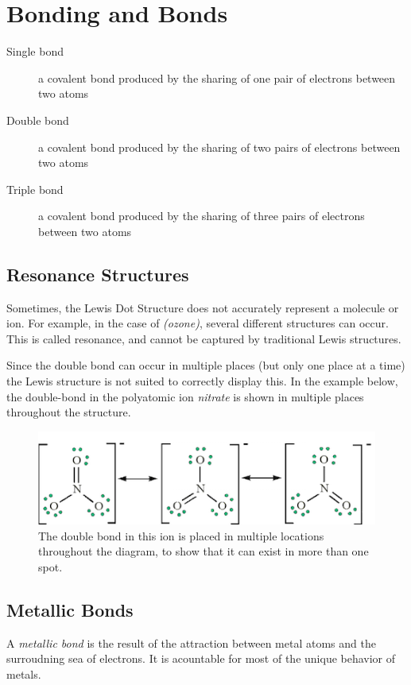 \section{Bonding and Bonds}
\begin{description}
  \item[Single bond] a covalent bond produced by the sharing of one pair of
    electrons between two atoms
  \item[Double bond] a covalent bond produced by the sharing of two pairs of
    electrons between two atoms
  \item[Triple bond] a covalent bond produced by the sharing of three pairs of
    electrons between two atoms
\end{description}

\subsection{Resonance Structures}
Sometimes, the Lewis Dot Structure does not accurately represent a molecule or
ion.  For example, in the case of  \textit{(ozone)}, several different
structures can occur.  This is called resonance, and cannot be captured by
traditional Lewis structures.

Since the double bond can occur in multiple places (but only one place at a
time) the Lewis structure is not suited to correctly display this.  In the
example below, the double-bond in the polyatomic ion \textit{nitrate} is shown
in multiple places throughout the structure.

\begin{figure}[H]
  \centering
  \includegraphics{res/nitrate_resonance.png}
  \caption{The double bond in this ion is placed in multiple locations
  throughout the diagram, to show that it can exist in more than one spot.}
\end{figure}

\subsection{Metallic Bonds}
A \textit{metallic bond} is the result of the attraction between metal atoms and
the surroudning sea of electrons.  It is acountable for most of the unique
behavior of metals.

